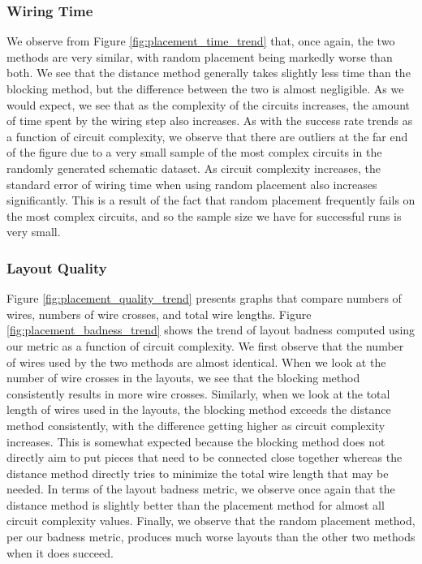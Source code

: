 \subsubsection{Wiring Time}
We observe from
Figure \ref{fig:placement_time_trend} that, once again, the two methods are
very similar, with random placement being markedly worse than both.
We see that the distance method generally takes slightly less
time than the blocking method, but the difference between the two is
almost negligible. As we would expect, we see that as the complexity
of the circuits increases, the amount of time spent by the wiring step also
increases. As with the success rate trends as a function of circuit
complexity, we observe that there are outliers at the far end of the figure due
to a very small sample of the most complex circuits in the randomly generated
schematic dataset. As circuit complexity increases, the standard error of
wiring time
when using random placement also increases significantly. This is a result of
the fact that random placement frequently fails on the most complex
circuits, and so the sample size we have for successful runs is very small.

\subsubsection{Layout Quality}
Figure
\ref{fig:placement_quality_trend} presents graphs that compare numbers of wires,
numbers of wire crosses, and total wire lengths.
Figure \ref{fig:placement_badness_trend} shows the trend of layout badness
computed using our metric as a function of circuit complexity.
We first observe that the
number of wires used by the two methods are almost identical. When
we look at the number of wire crosses in the layouts, we
see that the blocking method consistently results in more wire crosses.
Similarly,
when we look at the total length of wires used in the layouts, the blocking
method exceeds the distance method consistently, with the difference getting
higher as circuit complexity increases.
This is somewhat expected because the blocking method does not directly aim to
put pieces that need to be connected close together whereas the distance method
directly tries to minimize the total wire length that may be needed. In terms
of the layout badness metric, we observe once again that the distance method
is slightly better than the placement method for almost all circuit complexity
values. Finally, we observe that the random
placement method, per our badness metric, produces much worse layouts than the
other two methods when it does succeed.

